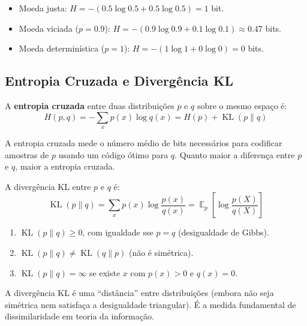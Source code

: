 \documentclass{tufte-handout}
\DeclareMathOperator{\E}{\mathbb{E}}
\DeclareMathOperator{\KL}{KL}
\begin{document}
\begin{exmp}
    \begin{itemize}
        \item Moeda justa: $H = -(0.5\log 0.5 + 0.5\log 0.5) = 1$ bit.
        \item Moeda viciada ($p=0.9$): $H = -(0.9\log 0.9 + 0.1\log 0.1) \approx 0.47$ bits.
        \item Moeda determinística ($p=1$): $H = -(1\log 1 + 0\log 0) = 0$ bits.
    \end{itemize}
\end{exmp}

\subsection{Entropia Cruzada e Divergência KL}

\begin{defn}
    A \textbf{entropia cruzada} entre duas distribuições $p$ e $q$ sobre o mesmo espaço é:
    \[
    H(p, q) = -\sum_{x} p(x) \log q(x) = H(p) + \KL(p \parallel q)
    \]
\end{defn}

A entropia cruzada mede o número médio de bits necessários para codificar amostras de
$p$ usando um código ótimo para $q$. Quanto maior a diferença entre $p$ e $q$, maior
a entropia cruzada.

\begin{defn}
    A divergência KL entre $p$ e $q$ é:
    \[
    \KL(p \parallel q) = \sum_{x} p(x) \log \frac{p(x)}{q(x)} = \E_{p}\left[\log \frac{p(X)}{q(X)}\right]
    \]
\end{defn}

\begin{prop}
    \begin{enumerate}
        \item $\KL(p \parallel q) \ge 0$, com igualdade sse $p = q$ (desigualdade de Gibbs).
        \item $\KL(p \parallel q) \neq \KL(q \parallel p)$ (não é simétrica).
        \item $\KL(p \parallel q) = \infty$ se existe $x$ com $p(x) > 0$ e $q(x) = 0$.
    \end{enumerate}
\end{prop}

A divergência KL é uma ``distância'' entre distribuições (embora não seja simétrica nem
satisfaça a desigualdade triangular). É a medida fundamental de dissimilaridade em teoria
da informação.
\end{document}
